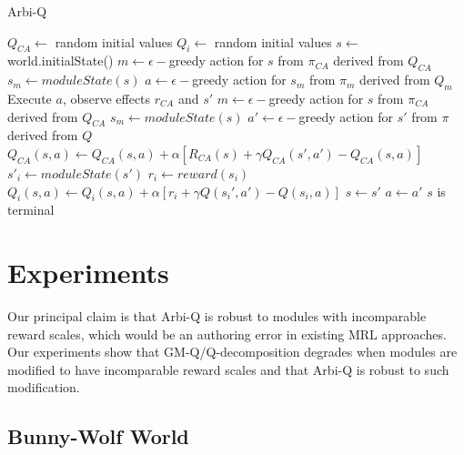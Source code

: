 \begin{algorithm}
  \caption{Arbi-Q}\label{alg:arbiq}
  \begin{algorithmic}
    \State $Q_{CA} \gets$ random initial values
       \State $Q_{i} \gets$ random initial values
    \EndFor
      \State $s \gets$ world.initialState()
      \State $m \gets \epsilon-$greedy action for $s$ from $\pi_{CA}$ derived from $Q_{CA}$ 
      \State $s_{m} \gets moduleState(s)$ 
      \State $a \gets \epsilon-$greedy action for $s_{m}$ from $\pi_m$ derived from $Q_m$
      \Repeat
        \State Execute $a$, observe effects $r_{CA}$ and $s'$
        \State $m \gets \epsilon-$greedy action for $s$ from $\pi_{CA}$ derived from $Q_{CA}$ 
        \State $s_{m} \gets moduleState(s)$ 
        \State $a' \gets \epsilon-$greedy action for $s'$ from $\pi$ derived from $Q$
        \State $Q_{CA}(s, a) \gets Q_{CA}(s, a) + \alpha [R_{CA}(s) + \gamma Q_{CA}(s', a') - Q_{CA}(s, a)]$
          \State $s'_{i} \gets moduleState(s')$ 
          \State $r_i \gets reward(s_i)$ 
          \State $Q_i(s, a) \gets Q_i(s, a) + \alpha [r_i + \gamma Q(s_i', a') - Q(s_i, a)]$
        \EndFor
        \State $s \gets s'$
        \State $a \gets a'$
      \Until $s$ is terminal
    \EndFor
  \end{algorithmic}
\end{algorithm}


\section{Experiments}

Our principal claim is that Arbi-Q is robust to modules with incomparable reward scales, which would be an authoring error in existing MRL approaches. Our experiments show that GM-Q/Q-decomposition degrades when modules are modified to have incomparable reward scales and that Arbi-Q is robust to such modification.

\subsection{Bunny-Wolf World}

